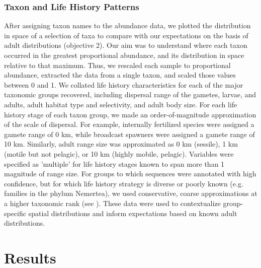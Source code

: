 \documentclass[11pt,letterpaper]{article} %
\begin{document}
\subsubsection*{Taxon and Life History Patterns}
After assigning taxon names to the abundance data, we plotted the distribution in space of a selection of taxa to compare with our expectations on the basis of adult distributions (objective 2). Our aim was to understand where each taxon occurred in the greatest proportional abundance, and its distribution in space relative to that maximum. Thus, we rescaled each sample to proportional abundance, extracted the data from a single taxon, and scaled those values between 0 and 1. We collated life history characteristics for each of the major taxonomic groups recovered, including dispersal range of the gametes, larvae, and adults, adult habitat type and selectivity, and adult body size. For each life history stage of each taxon group, we made an order-of-magnitude approximation of the scale of dispersal. For example, internally fertilized species were assigned a gamete range of 0 km, while broadcast spawners were assigned a gamete range of 10 km. Similarly, adult range size was approximated as 0 km (sessile), 1 km (motile but not pelagic), or 10 km (highly mobile, pelagic). Variables were specified as 'multiple' for life history stages known to span more than 1 magnitude of range size. For groups to which sequences were annotated with high confidence, but for which life history strategy is diverse or poorly known (e.g. families in the phylum Nemertea), we used conservative, coarse approximations at a higher taxonomic rank (see ). These data were used to contextualize group-specific spatial distributions and inform expectations based on known adult distributions.



\section*{Results}
\end{document}
